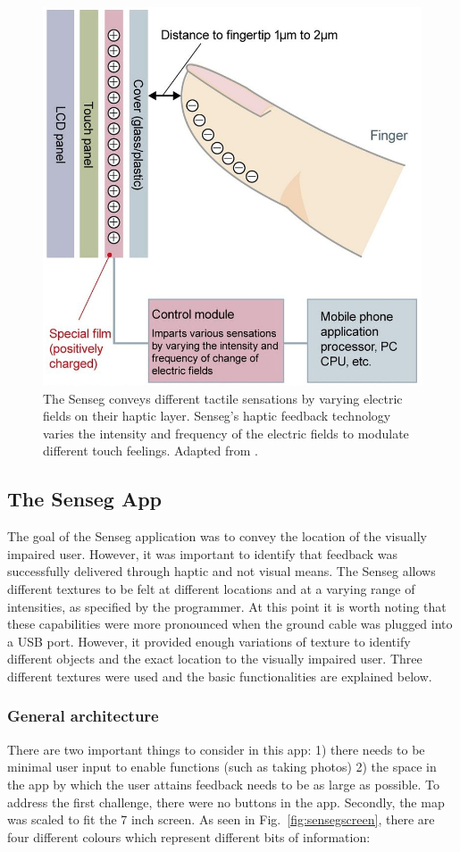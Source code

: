 \begin{figure}
\centering
\includegraphics[width= .7\linewidth]{gfx/Chapter06/senseg_technology.png}
\caption{The Senseg conveys different tactile sensations by varying electric fields on their haptic layer. Senseg's haptic feedback technology varies the intensity and frequency of the electric fields to modulate different touch feelings. Adapted from \citep{Senseg}.}
\label{fig:senseg_tech}
\end{figure}

\subsection{The Senseg App}
The goal of the Senseg application was to convey the location of the visually impaired user. However, it was important to identify that feedback was successfully delivered through haptic and not visual means. The Senseg allows different textures to be felt at different locations and at a varying range of intensities, as specified by the programmer. At this point it is worth noting that these capabilities were more pronounced when the ground cable was plugged into a USB port. However, it provided enough variations of texture to identify different objects and the exact location to the visually impaired user. Three different textures were used and the basic functionalities are explained below.

\subsubsection{General architecture} 
There are two important things to consider in this app: 1) there needs to be minimal user input to enable functions (such as taking photos) 2) the space in the app by which the user attains feedback needs to be as large as possible. To address the first challenge, there were no buttons in the app. Secondly, the map was scaled to fit the 7 inch screen.  As seen in Fig.~\ref{fig:sensegscreen}, there are four different colours which represent different bits of information:


